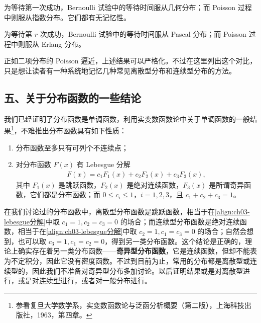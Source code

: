 \documentclass[../../main.tex]{subfiles}
\begin{document}
为等待第一次成功，Bernoulli 试验中的等待时间服从几何分布；而 Poisson 过程中则服从指数分布。它们都有无记忆性。

为等待第 $r$ 次成功，Bernoulli 试验中的等待时间服从 Pascal 分布；而 Poisson 过程中则服从 Erlang 分布。

正如二项分布的 Poisson 逼近，上述结果可以严格化。不过在这里列出这个对比，只是想让读者有一种系统地记忆几种常见离散型分布和连续型分布的方法。

\subsection*{五、关于分布函数的一些结论}

我们已经证明了分布函数是单调函数，利用实变数函数论中关于单调函数的一般结果\footnote{参看复旦大学数学系，实变数函数论与泛函分析概要（第二版），上海科技出版社，1963，第四章。}，不难推出分布函数具有如下性质：
\begin{enumerate}
\item 分布函数至多只有可列个不连续点；
\item 对分布函数 $F(x)$ 有 Lebesgue 分解
\begin{align}
F(x)=c_1F_1(x)+c_2F_2(x)+c_3F_3(x),\label{align:ch03-lebesgue分解}
\end{align}
其中 $F_1(x)$ 是跳跃函数，$F_2(x)$ 是绝对连续函数，$F_3(x)$ 是所谓奇异函数，它们都是分布函数；而 $0\leqslant c_i\leqslant 1$，$i=1,2,3$，且 $c_1+c_2+c_3=1$。
\end{enumerate}

在我们讨论过的分布函数中，离散型分布函数是跳跃函数，相当于在\eqref{align:ch03-lebesgue分解}中取 $c_1=1,c_2=c_3=0$ 的场合；而连续型分布函数是绝对连续函数，相当于在\eqref{align:ch03-lebesgue分解}中取 $c_2=1,c_1=c_3=0$ 的场合；自然会想到，也可以取 $c_3=1,c_1=c_2=0$，得到另一类分布函数。这个结论是正确的，理论上确实存在着另一类分布函数——\textbf{奇异型分布函数}，它是连续函数，但却不能表为不定积分，因此它没有密度函数。不过到目前为止，常用的分布都是离散型或连续型的，因此我们不准备对奇异型分布多加讨论。以后证明结果或是对离散型进行，或是对连续型进行，或者对一般分布进行。
\end{document}
